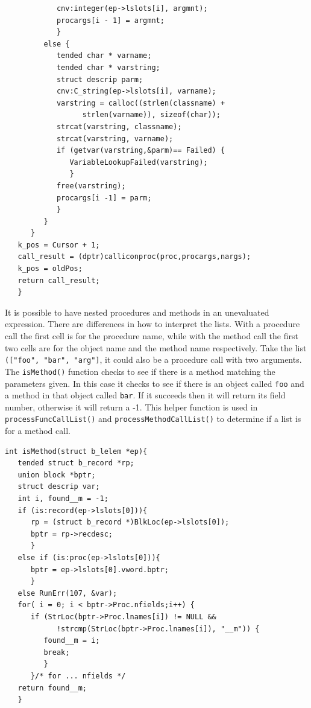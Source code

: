 \documentclass{article}
\begin{document}
\begin{verbatim}
            cnv:integer(ep->lslots[i], argmnt);
            procargs[i - 1] = argmnt;
            }
         else {
            tended char * varname;
            tended char * varstring;
            struct descrip parm;
            cnv:C_string(ep->lslots[i], varname);
            varstring = calloc((strlen(classname) +
                  strlen(varname)), sizeof(char));
            strcat(varstring, classname);
            strcat(varstring, varname);
            if (getvar(varstring,&parm)== Failed) {
               VariableLookupFailed(varstring);
               }
            free(varstring);
            procargs[i -1] = parm;
            }
         }
      }
   k_pos = Cursor + 1;
   call_result = (dptr)calliconproc(proc,procargs,nargs);
   k_pos = oldPos;
   return call_result;
   }
\end{verbatim}

It is possible to have nested procedures and methods in an unevaluated expression.  There are differences in how to interpret the lists.  With a procedure call the first cell is for the procedure name, while with the method call the first two cells are for the object name and the method name respectively.  Take the list \texttt{(["foo", "bar", "arg"]}, it could also be a procedure call with two arguments.  The \texttt{isMethod()} function checks to see if there is a method matching the parameters given.  In this case it checks to see if there is an object called \texttt{foo} and a method in that object called \texttt{bar}.  If it succeeds then it will return its field number, otherwise it will return a -1.  This helper function is used in \texttt{processFuncCallList()} and \texttt{processMethodCallList()} to determine if a list is for a method call.\\

\begin{verbatim}
int isMethod(struct b_lelem *ep){
   tended struct b_record *rp;
   union block *bptr;
   struct descrip var;
   int i, found__m = -1;
   if (is:record(ep->lslots[0])){
      rp = (struct b_record *)BlkLoc(ep->lslots[0]);
      bptr = rp->recdesc;
      }
   else if (is:proc(ep->lslots[0])){
      bptr = ep->lslots[0].vword.bptr;
      }
   else RunErr(107, &var);
   for( i = 0; i < bptr->Proc.nfields;i++) {
      if (StrLoc(bptr->Proc.lnames[i]) != NULL &&
            !strcmp(StrLoc(bptr->Proc.lnames[i]), "__m")) {
         found__m = i;
         break;
         }
      }/* for ... nfields */
   return found__m;
   }
\end{verbatim}
\end{document}
